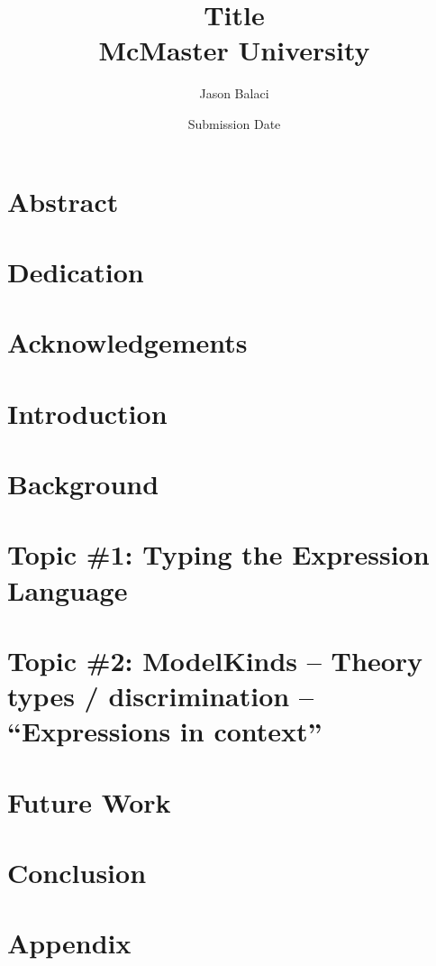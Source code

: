 \documentclass[12pt]{report}
\title{
    {Title}\\
    {McMaster University}
}
\author{Jason Balaci}
\date{Submission Date}
\begin{document}
    \maketitle

    \chapter*{Abstract}
    

    \chapter*{Dedication}
    

    \chapter*{Acknowledgements}
    

    \tableofcontents

    \chapter{Introduction}
    

    \chapter{Background}
    
    
    \chapter{Topic \#1: Typing the Expression Language}
    
    
    \chapter{Topic \#2: ModelKinds -- Theory types / discrimination -- ``Expressions in context''}
    


    \chapter{Future Work}
    
    
    \chapter{Conclusion}
    

    \appendix
    \chapter{Appendix}
    

\end{document}

